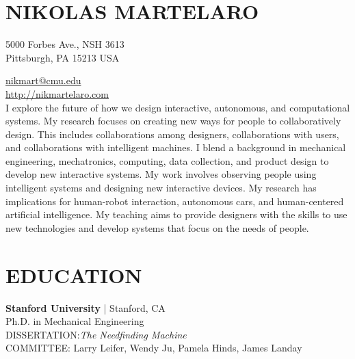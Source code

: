 \documentclass[11pt]{article} %
\begin{document}

\section*{NIKOLAS MARTELARO}

5000 Forbes Ave., NSH 3613 \\ 
Pittsburgh, PA 15213 USA


\href{mailto:nikmart@cmu.edu}{nikmart@cmu.edu}\\ %
\href{http://nikmartelaro.com}{http://nikmartelaro.com}\\ %
\bigskip\bigskip %
I explore the future of how we design interactive, autonomous, and computational systems. 
My research focuses on creating new ways for people to collaboratively design. 
This includes collaborations among designers, collaborations with users, and collaborations with intelligent machines. 
I blend a background in mechanical engineering, mechatronics, computing, data collection, and product design to develop new interactive systems.
My work involves observing people using intelligent systems and designing new interactive devices. 
My research has implications for human-robot interaction, autonomous cars, and human-centered artificial intelligence. 
My teaching aims to provide designers with the skills to use new technologies and develop systems that focus on the needs of people.

\section*{EDUCATION}

\textbf{Stanford University} | Stanford, CA\\
Ph.D. in Mechanical Engineering\\
DISSERTATION:\emph{The Needfinding Machine}\\
COMMITTEE: Larry Leifer, Wendy Ju, Pamela Hinds, James Landay
\medskip 
\end{document}
